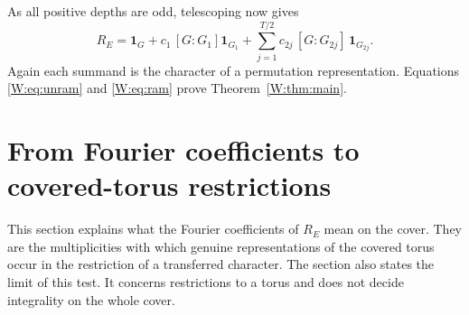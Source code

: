 As all positive depths are odd, telescoping now gives
\begin{equation}\label{W:eq:ram}
\boxed{R_E=\mathbf1_G+c_1\,[G:G_1] \mathbf1_{G_1}
 +\sum_{j=1}^{T/2}c_{2j}\,[G:G_{2j}]\,\mathbf1_{G_{2j}}.}
\end{equation}
Again each summand is the character of a permutation representation. Equations \eqref{W:eq:unram} and \eqref{W:eq:ram} prove Theorem~\ref{W:thm:main}.

\section{From Fourier coefficients to covered-torus restrictions}\label{W:sec:fourier}
This section explains what the Fourier coefficients of $R_E$ mean on the cover. They are the multiplicities with which genuine representations of the covered torus occur in the restriction of a transferred character. The section also states the limit of this test. It concerns restrictions to a torus and does not decide integrality on the whole cover.

